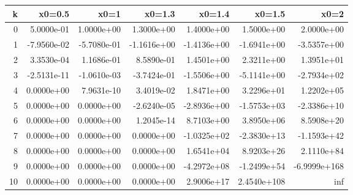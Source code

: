\begin{tabular}{rrrrrrr}
\toprule
k & x0=0.5 & x0=1 & x0=1.3 & x0=1.4 & x0=1.5 & x0=2 \\
\midrule
0 & 5.0000e-01 & 1.0000e+00 & 1.3000e+00 & 1.4000e+00 & 1.5000e+00 & 2.0000e+00 \\
1 & -7.9560e-02 & -5.7080e-01 & -1.1616e+00 & -1.4136e+00 & -1.6941e+00 & -3.5357e+00 \\
2 & 3.3530e-04 & 1.1686e-01 & 8.5890e-01 & 1.4501e+00 & 2.3211e+00 & 1.3951e+01 \\
3 & -2.5131e-11 & -1.0610e-03 & -3.7424e-01 & -1.5506e+00 & -5.1141e+00 & -2.7934e+02 \\
4 & 0.0000e+00 & 7.9631e-10 & 3.4019e-02 & 1.8471e+00 & 3.2296e+01 & 1.2202e+05 \\
5 & 0.0000e+00 & 0.0000e+00 & -2.6240e-05 & -2.8936e+00 & -1.5753e+03 & -2.3386e+10 \\
6 & 0.0000e+00 & 0.0000e+00 & 1.2045e-14 & 8.7103e+00 & 3.8950e+06 & 8.5908e+20 \\
7 & 0.0000e+00 & 0.0000e+00 & 0.0000e+00 & -1.0325e+02 & -2.3830e+13 & -1.1593e+42 \\
8 & 0.0000e+00 & 0.0000e+00 & 0.0000e+00 & 1.6541e+04 & 8.9203e+26 & 2.1110e+84 \\
9 & 0.0000e+00 & 0.0000e+00 & 0.0000e+00 & -4.2972e+08 & -1.2499e+54 & -6.9999e+168 \\
10 & 0.0000e+00 & 0.0000e+00 & 0.0000e+00 & 2.9006e+17 & 2.4540e+108 & inf \\
\bottomrule
\end{tabular}
